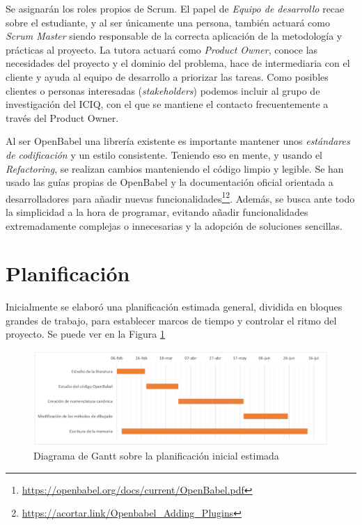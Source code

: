 Se asignarán los roles propios de Scrum. El papel de \emph{Equipo de desarrollo} recae sobre el estudiante, y al ser únicamente una persona, también actuará como \emph{Scrum Master} siendo responsable de la correcta aplicación de la metodología y prácticas al proyecto. La tutora actuará como \emph{Product Owner}, conoce las necesidades del proyecto y el dominio del problema, hace de intermediaria con el cliente y ayuda al equipo de desarrollo a priorizar las tareas. Como posibles clientes o personas interesadas (\emph{stakeholders}) podemos incluir al grupo de investigación del ICIQ, con el que se mantiene el contacto frecuentemente a través del Product Owner.

Al ser OpenBabel una librería existente es importante mantener unos \emph{estándares de codificación} y un estilo consistente. Teniendo eso en mente, y usando el \emph{Refactoring}, se realizan cambios manteniendo el código limpio y legible. Se han usado las guías propias de OpenBabel y la documentación oficial orientada a desarrolladores para añadir nuevas funcionalidades\footnote{\url{https://openbabel.org/docs/current/OpenBabel.pdf}}\footnotecomma \footnote{\url{https://acortar.link/Openbabel_Adding_Plugins}}. Además, se busca ante todo la simplicidad a la hora de programar, evitando añadir funcionalidades extremadamente complejas o innecesarias y la adopción de soluciones sencillas.

\section{Planificación}
Inicialmente se elaboró una planificación estimada general, dividida en bloques grandes de trabajo, para establecer marcos de tiempo y controlar el ritmo del proyecto. Se puede ver en la Figura \ref{fig:gantt_incial_estimado}
\begin{figure}[h!]
    \centering
    \includegraphics[scale=0.43]{imagenes/planificacion/planificacion_estimada.png}
    \caption{Diagrama de Gantt sobre la planificación inicial estimada}
    \label{fig:gantt_incial_estimado}
\end{figure}

